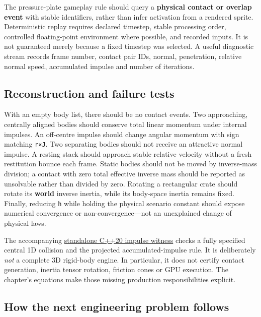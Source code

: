 The pressure-plate gameplay rule should query a \textbf{physical contact or overlap event} with stable identifiers, rather than infer activation from a rendered sprite. Deterministic replay requires declared timestep, stable processing order, controlled floating-point environment where possible, and recorded inputs. It is not guaranteed merely because a fixed timestep was selected. A useful diagnostic stream records frame number, contact pair IDs, normal, penetration, relative normal speed, accumulated impulse and number of iterations.

\subsection{Reconstruction and failure tests}\label{06-engine-ii-ch033-reconstruction-and-failure-tests}

\hypertarget{06-engine-ii-ch033-reconstruction-and-failure-tests}{}

With an empty body list, there should be no contact events. Two approaching, centrally aligned bodies should conserve total linear momentum under internal impulses. An off-centre impulse should change angular momentum with sign matching \texttt{r×J}. Two separating bodies should not receive an attractive normal impulse. A resting stack should approach stable relative velocity without a fresh restitution bounce each frame. Static bodies should not be moved by inverse-mass division; a contact with zero total effective inverse mass should be reported as unsolvable rather than divided by zero. Rotating a rectangular crate should rotate its \textbf{world} inverse inertia, while its body-space inertia remains fixed. Finally, reducing \texttt{h} while holding the physical scenario constant should expose numerical convergence or non-convergence---not an unexplained change of physical laws.

The accompanying \hyperref[source-file-128143bcbfc7213e97eaefa4]{standalone C++20 impulse witness} checks a fully specified central 1D collision and the projected accumulated-impulse rule. It is deliberately \emph{not} a complete 3D rigid-body engine. In particular, it does not certify contact generation, inertia tensor rotation, friction cones or GPU execution. The chapter's equations make those missing production responsibilities explicit.

\subsection{How the next engineering problem follows}\label{06-engine-ii-ch033-how-the-next-engineering-problem-follows}

